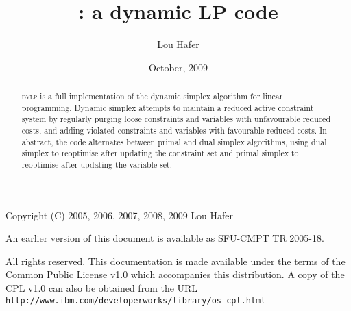 \documentclass[titlepage]{article}
\title{\bfseries \dylp: a dynamic LP code}
\author{Lou Hafer}
\date{October, 2009}
\newcommand{\dylp}{\textsc{dylp}\xspace}
\begin{document}
\maketitle

\thispagestyle{empty}
\vspace*{\fill}

\noindent
Copyright (C) 2005, 2006, 2007, 2008, 2009 Lou Hafer

\noindent
An earlier version of this document is available as SFU-CMPT TR 2005-18.

\noindent
All rights reserved. This documentation is made available under the terms of
the Common Public License v1.0 which accompanies this distribution.
A copy of the CPL v1.0 can also be obtained from the URL
\texttt{http://www.ibm.com/developerworks/library/os-cpl.html}

\begin{abstract}\noindent
\dylp is a full implementation of the dynamic simplex algorithm for
linear programming.
Dynamic simplex attempts to maintain a reduced active constraint system
by regularly
purging loose constraints and variables with unfavourable reduced costs, and
adding violated constraints and variables with favourable reduced costs.
In abstract, the code alternates between primal and dual simplex algorithms,
using dual simplex to reoptimise after updating the constraint set and primal
simplex to reoptimise after updating the variable set.
\end{abstract}

\tableofcontents

\pagebreak

\listoffigures
\listoftables























\end{document}
